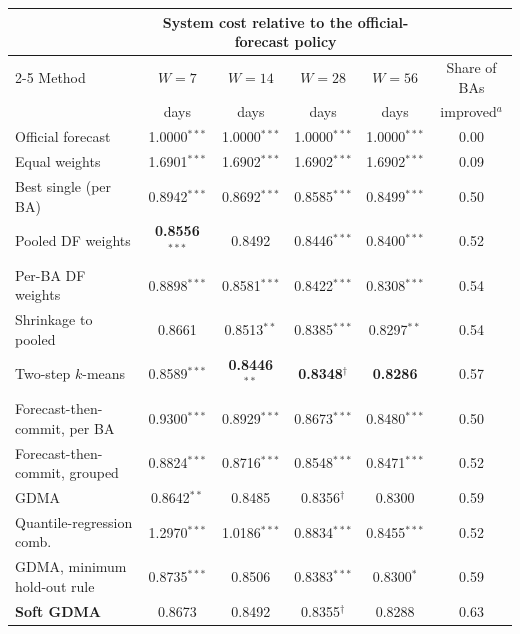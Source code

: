 \begin{tabular}{@{}lccccc@{}}
\toprule
 & \multicolumn{4}{c}{System cost relative to the official-forecast policy} & \\
\cmidrule(lr){2-5}
Method & $W=7$ & $W=14$ & $W=28$ & $W=56$ & Share of BAs \\
 & days & days & days & days & improved$^a$ \\
\midrule
Official forecast & 1.0000$^{***}$ & 1.0000$^{***}$ & 1.0000$^{***}$ & 1.0000$^{***}$ & 0.00 \\
Equal weights & 1.6901$^{***}$ & 1.6902$^{***}$ & 1.6902$^{***}$ & 1.6902$^{***}$ & 0.09 \\
Best single (per BA) & 0.8942$^{***}$ & 0.8692$^{***}$ & 0.8585$^{***}$ & 0.8499$^{***}$ & 0.50 \\
Pooled DF weights & \textbf{0.8556}$^{***}$ & 0.8492 & 0.8446$^{***}$ & 0.8400$^{***}$ & 0.52 \\
Per-BA DF weights & 0.8898$^{***}$ & 0.8581$^{***}$ & 0.8422$^{***}$ & 0.8308$^{***}$ & 0.54 \\
Shrinkage to pooled & 0.8661 & 0.8513$^{**}$ & 0.8385$^{***}$ & 0.8297$^{**}$ & 0.54 \\
Two-step $k$-means & 0.8589$^{***}$ & \textbf{0.8446}$^{**}$ & \textbf{0.8348}$^\dagger$ & \textbf{0.8286} & 0.57 \\
Forecast-then-commit, per BA & 0.9300$^{***}$ & 0.8929$^{***}$ & 0.8673$^{***}$ & 0.8480$^{***}$ & 0.50 \\
Forecast-then-commit, grouped & 0.8824$^{***}$ & 0.8716$^{***}$ & 0.8548$^{***}$ & 0.8471$^{***}$ & 0.52 \\
GDMA & 0.8642$^{**}$ & 0.8485 & 0.8356$^\dagger$ & 0.8300 & 0.59 \\
Quantile-regression comb. & 1.2970$^{***}$ & 1.0186$^{***}$ & 0.8834$^{***}$ & 0.8455$^{***}$ & 0.52 \\
GDMA, minimum hold-out rule & 0.8735$^{***}$ & 0.8506 & 0.8383$^{***}$ & 0.8300$^{*}$ & 0.59 \\
\textbf{Soft GDMA} & 0.8673 & 0.8492 & 0.8355$^\dagger$ & 0.8288 & 0.63 \\
\bottomrule
\end{tabular}